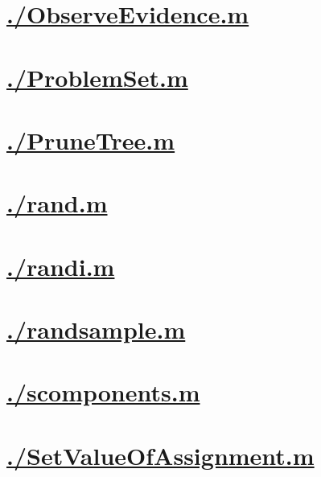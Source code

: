 \documentclass{article}
\begin{document}
    \section{\hyperref[toc]{./ObserveEvidence.m}}
        \newpage
    \section{\hyperref[toc]{./ProblemSet.m}}
        \newpage
    \section{\hyperref[toc]{./PruneTree.m}}
        \newpage
    \section{\hyperref[toc]{./rand.m}}
        \newpage
    \section{\hyperref[toc]{./randi.m}}
        \newpage
    \section{\hyperref[toc]{./randsample.m}}
        \newpage
    \section{\hyperref[toc]{./scomponents.m}}
        \newpage
    \section{\hyperref[toc]{./SetValueOfAssignment.m}}
        \newpage
\end{document}
